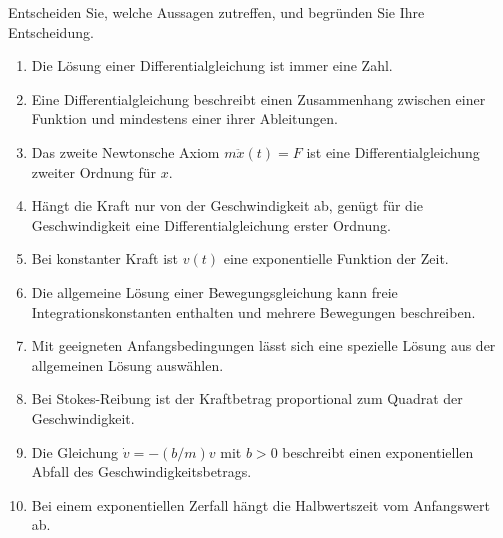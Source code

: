 \begin{ExerciseBlock}
Entscheiden Sie, welche Aussagen zutreffen, und begründen Sie Ihre Entscheidung.
\begin{enumerate}
\item Die Lösung einer Differentialgleichung ist immer eine Zahl.
\item Eine Differentialgleichung beschreibt einen Zusammenhang zwischen einer Funktion und mindestens einer ihrer Ableitungen.
\item Das zweite Newtonsche Axiom $m\ddot x(t)=F$ ist eine Differentialgleichung zweiter Ordnung für $x$.
\item Hängt die Kraft nur von der Geschwindigkeit ab, genügt für die Geschwindigkeit eine Differentialgleichung erster Ordnung.
\item Bei konstanter Kraft ist $v(t)$ eine exponentielle Funktion der Zeit.
\item Die allgemeine Lösung einer Bewegungsgleichung kann freie Integrationskonstanten enthalten und mehrere Bewegungen beschreiben.
\item Mit geeigneten Anfangsbedingungen lässt sich eine spezielle Lösung aus der allgemeinen Lösung auswählen.
\item Bei Stokes-Reibung ist der Kraftbetrag proportional zum Quadrat der Geschwindigkeit.
\item Die Gleichung $\dot v=-(b/m)v$ mit $b>0$ beschreibt einen exponentiellen Abfall des Geschwindigkeitsbetrags.
\item Bei einem exponentiellen Zerfall hängt die Halbwertszeit vom Anfangswert ab.
\end{enumerate}
\end{ExerciseBlock}
